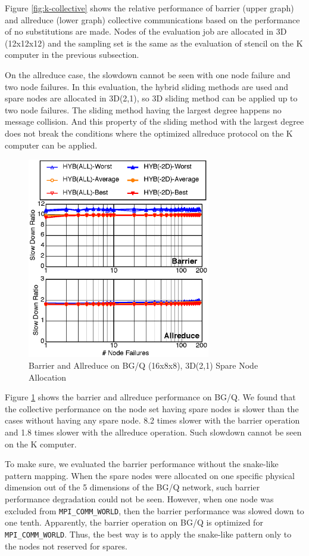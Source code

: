 \documentclass[Afour,times,sageh]{sagej}
\begin{document}
Figure \ref{fig:k-collective} shows the relative performance of
barrier (upper graph) and allreduce (lower graph) collective
communications based on the performance of no substitutions are
made. Nodes of the evaluation job are allocated in 3D (12x12x12) and
the sampling set is the same as the evaluation of stencil on the
K computer in the previous subsection.

On the allreduce case, the slowdown cannot be seen with one node
failure and two node failures. In this evaluation, the hybrid sliding
methods are used and spare nodes are allocated in 3D(2,1), so 3D
sliding method can be applied up to two node failures. The sliding
method having the largest degree happens no message collision. And
this property of
the sliding method with the largest degree does not break the
conditions where the optimized allreduce protocol on the K computer
can be applied.

\begin{figure}[ht]
\centering
\includegraphics[width=80mm]{Figs/BGQ-Collective-CL.eps}
  \caption{Barrier and Allreduce on BG/Q (16x8x8), 3D(2,1) Spare Node
    Allocation}
  \label{fig:bgq-collective}
\end{figure}

Figure \ref{fig:bgq-collective} shows the barrier and allreduce
performance on BG/Q. We found that the collective performance on
the node set having spare nodes is slower than the cases without
having any spare node. 8.2 times slower with the barrier operation and
1.8 times slower with the allreduce operation. Such slowdown
cannot be seen on the K computer.

To make sure, we evaluated the barrier performance
without the snake-like pattern mapping. When the spare nodes were
allocated on one specific physical dimension out of the 5 dimensions
of the BG/Q network, such barrier performance degradation could not be
seen. However, when one node was excluded from {\tt MPI\_COMM\_WORLD},
then the barrier performance was slowed down to one tenth. Apparently,
the barrier operation on BG/Q is optimized for {\tt
  MPI\_COMM\_WORLD}. Thus, the best way is to apply the snake-like
pattern only to the nodes not reserved for spares.
\end{document}
